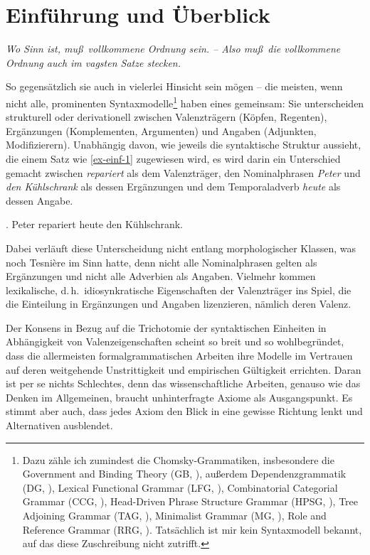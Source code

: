 \chapter{Einführung und Überblick} \label{sec-einfuehrung}


\setlength{\epigraphwidth}{.37\textwidth}
\epigraph{\em Wo Sinn ist, mu\ss \ vollkommene Ordnung sein. -- Also mu\ss \ die vollkommene Ordnung auch im vagsten Satze stecken.\\[-5ex]}{\citet[\S 98]{Wittgenstein:84}}

\noindent So gegensätzlich sie auch in vielerlei Hinsicht sein mögen -- die meisten, wenn nicht alle, prominenten Syntaxmodelle\footnote{Dazu zähle ich zumindest die Chomsky-Grammatiken, insbesondere die Government and Binding Theory (GB, \citealt{Chomsky:81}), au\ss erdem Dependenzgrammatik (DG, \citealt{Tesniere:59,Kunze:75,Heringer:96}), Lexical Functional Grammar (LFG, \citealt{Kaplan:Bresnan:82}), Combinatorial Categorial Grammar (CCG, \citealt{Steedman:00}), Head-Driven Phrase Structure Grammar (HPSG, \citealt{Pollard:Sag:94}), Tree Adjoining Grammar (TAG, \citealt{Joshi:Schabes:97}), Minimalist Grammar (MG, \citealt{Stabler:97}), Role and Reference Grammar (RRG, \citealt{Valin:05}). Tatsächlich ist mir kein Syntaxmodell bekannt, auf das diese Zuschreibung nicht zutrifft.} haben eines gemeinsam: Sie unterscheiden strukturell oder derivationell zwischen Valenzträgern (Köpfen, Regenten), Ergänzungen (Komplementen, Argumenten) und Angaben (Adjunkten, Modifizierern). Unabhängig davon, wie jeweils die syntaktische Struktur aussieht, die einem Satz wie \ref{ex-einf-1} zugewiesen wird, es wird darin ein Unterschied gemacht zwischen {\it repariert} als dem Valenzträger, den Nominalphrasen {\it Peter} und {\it den Kühlschrank} als dessen Ergänzungen und dem Temporaladverb {\it heute} als dessen Angabe.
  
\ex. \label{ex-einf-1} Peter repariert heute den Kühlschrank.

Dabei verläuft diese Unterscheidung nicht entlang morphologischer Klassen, was noch Tesni\`ere im Sinn hatte, denn nicht alle Nominalphrasen gelten als Ergänzungen und nicht alle Adverbien als Angaben. Vielmehr kommen lexikalische, d.\,h.\ idiosynkratische Eigenschaften der Valenzträger ins Spiel, die die Einteilung in Ergänzungen und Angaben lizenzieren, nämlich deren Valenz.   

Der Konsens in Bezug auf die Trichotomie der syntaktischen Einheiten in Abhängigkeit von Valenzeigenschaften scheint so breit und so wohlbegründet, dass die allermeisten formalgrammatischen Arbeiten ihre Modelle im Vertrauen auf deren weitgehende Unstrittigkeit und empirischen Gültigkeit errichten. Daran ist per se nichts Schlechtes, denn das wissenschaftliche Arbeiten, genauso wie das Denken im Allgemeinen, braucht unhinterfragte Axiome als Ausgangspunkt. Es stimmt aber auch, dass jedes Axiom den Blick in eine gewisse Richtung lenkt und Alternativen ausblendet. 


